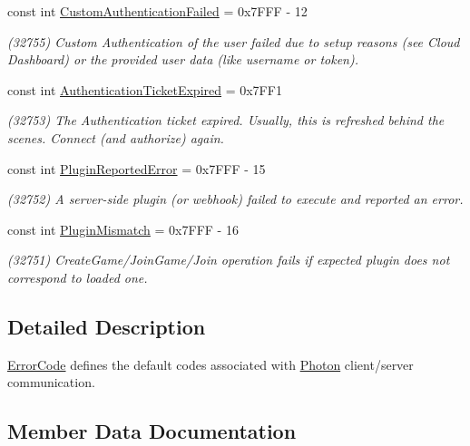 \begin{DoxyCompactItemize}
const int \hyperlink{class_exit_games_1_1_client_1_1_photon_1_1_error_code_a6b1fa4a285add5e81b8bda9dd343e215}{Custom\+Authentication\+Failed} = 0x7\+F\+F\+F -\/ 12
\begin{DoxyCompactList}\small\item\em (32755) Custom Authentication of the user failed due to setup reasons (see Cloud Dashboard) or the provided user data (like username or token). \end{DoxyCompactList}\item 
const int \hyperlink{class_exit_games_1_1_client_1_1_photon_1_1_error_code_a47cd3a6d5d9453e152026f3c9cec5a89}{Authentication\+Ticket\+Expired} = 0x7\+F\+F1
\begin{DoxyCompactList}\small\item\em (32753) The Authentication ticket expired. Usually, this is refreshed behind the scenes. Connect (and authorize) again.\end{DoxyCompactList}\item 
const int \hyperlink{class_exit_games_1_1_client_1_1_photon_1_1_error_code_aae1b5ea63ffb0891abe77ebc4aca0e99}{Plugin\+Reported\+Error} = 0x7\+F\+F\+F -\/ 15
\begin{DoxyCompactList}\small\item\em (32752) A server-\/side plugin (or webhook) failed to execute and reported an error. \end{DoxyCompactList}\item 
const int \hyperlink{class_exit_games_1_1_client_1_1_photon_1_1_error_code_a5dedf06ff727b7cd59d0850cc3afd5e9}{Plugin\+Mismatch} = 0x7\+F\+F\+F -\/ 16
\begin{DoxyCompactList}\small\item\em (32751) Create\+Game/\+Join\+Game/\+Join operation fails if expected plugin does not correspond to loaded one. \end{DoxyCompactList}\end{DoxyCompactItemize}


\subsection{Detailed Description}
\hyperlink{class_exit_games_1_1_client_1_1_photon_1_1_error_code}{Error\+Code} defines the default codes associated with \hyperlink{namespace_exit_games_1_1_client_1_1_photon}{Photon} client/server communication. 



\subsection{Member Data Documentation}

